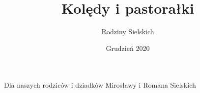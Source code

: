 \documentclass[a5paper,twoside,12pt]{article}
\newcommand*\stanza{%
    \par
    \begingroup
    \parindent=0pt
    \obeylines
    \obeyspaces
    \stanzax
}
\newcommand\stanzax[1]{%
    \filbreak
    #1%
    \vspace*{0.5cm}
    \par
    \endgroup
}
\begin{document}
\title{Kolędy i pastorałki}
\author{Rodziny Sielskich}
\date{Grudzień 2020}
\pagestyle{empty}
\maketitle
\vfill
\begin{flushright}
\stanza{
    Dla naszych rodziców i dziadków
    Mirosławy i Romana Sielskich
}
\end{flushright}

\leavevmode\thispagestyle{empty}\newpage

\tableofcontents
\newpage
\pagestyle{plain}


\end{document}
